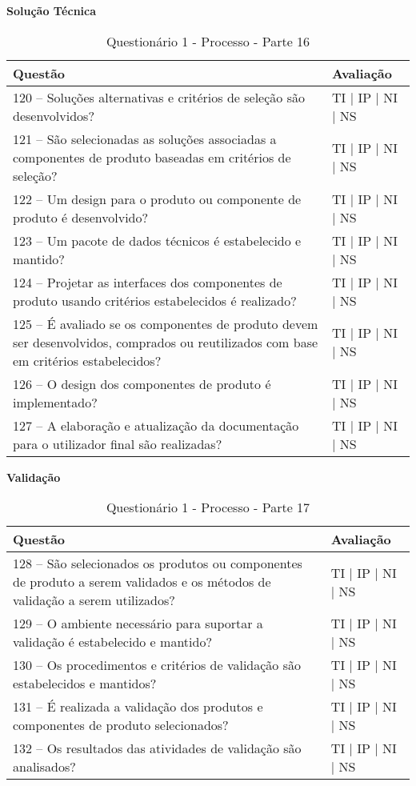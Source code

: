 \documentclass[openany,10pt,a4paper]{article}
\begin{document}
\begin{longtable}
\begin{appendix}
\begin{table}[h]
\textbf{Solução Técnica}
\centering
	\caption{Questionário 1 - Processo - Parte 16}
	\begin{tabular}{p{3.5in}p{2in}}		
		\toprule
		\textbf{Questão}  & \textbf{Avaliação}\\ 
		\midrule
		120 – Soluções alternativas e critérios de seleção são desenvolvidos?
 & TI | IP | NI | NS \\
        \midrule
		121 – São selecionadas as soluções associadas a componentes de produto baseadas em critérios 
de seleção?
 & TI | IP | NI | NS \\
		\midrule
		122 – Um design para o produto ou componente de produto é desenvolvido?
 & TI | IP | NI | NS \\
		\midrule
        123 – Um pacote de dados técnicos é estabelecido e mantido?
 & TI | IP | NI | NS \\
		\midrule
		124 – Projetar as interfaces dos componentes de produto usando critérios estabelecidos é 
realizado? 
  & TI | IP | NI | NS \\
		\midrule
		125 – É avaliado se os componentes de produto devem ser desenvolvidos, comprados ou 
reutilizados com base em critérios estabelecidos? 
 & TI | IP | NI | NS \\
 \midrule
		126 – O design dos componentes de produto é implementado?
 & TI | IP | NI | NS \\
        \midrule
        127 – A elaboração e atualização da documentação para o utilizador final são realizadas?
 & TI | IP | NI | NS \\
		\bottomrule
	\end{tabular} 
	\label{tab:tabela1}
\end{table}

\begin{table}[h]
\textbf{Validação}
	\centering
	\caption{Questionário 1 - Processo - Parte 17}
	\begin{tabular}{p{3.5in}p{2in}}		
		\toprule
		\textbf{Questão}  & \textbf{Avaliação}\\ 
		\midrule
		128 – São selecionados os produtos ou componentes de produto a serem validados e os 
métodos de validação a serem utilizados?
 & TI | IP | NI | NS \\
        \midrule
		129 – O ambiente necessário para suportar a validação é estabelecido e mantido?
 & TI | IP | NI | NS \\
		\midrule
		130 – Os procedimentos e critérios de validação são estabelecidos e mantidos?
 & TI | IP | NI | NS \\
		\midrule
        131 – É realizada a validação dos produtos e componentes de produto selecionados?
 & TI | IP | NI | NS \\
		\midrule
		132 – Os resultados das atividades de validação são analisados?
  & TI | IP | NI | NS \\
		\bottomrule
	\end{tabular} 
	\label{tab:tabela1}
\end{table}


\end{appendix}
\end{longtable}
\end{document}
